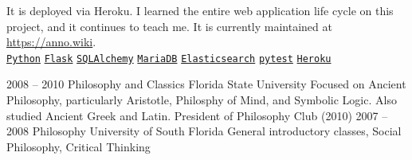 \documentclass[9pt]{developercv} %
\begin{document}
\begin{entrylist}
{            It is deployed via Heroku. I learned the entire web application life
            cycle on this project, and it continues to teach me. It is currently
            maintained at {\href{https://anno.wiki}{https://anno.wiki}}.
        \\
        \texttt{{\href{https://www.python.org/}{Python}}}\slashsep
        \texttt{{\href{https://flask.palletsprojects.com/en/1.1.x/}{Flask}}}\slashsep
        \texttt{{\href{https://www.sqlalchemy.org/}{SQLAlchemy}}}\slashsep
        \texttt{{\href{https://mariadb.org/}{MariaDB}}}\slashsep
        \texttt{{\href{https://www.elastic.co/}{Elasticsearch}}}\slashsep
        \texttt{{\href{https://docs.pytest.org/en/stable/}{pytest}}}\slashsep
        \texttt{{\href{https://www.heroku.com/}{Heroku}}}
        }
\end{entrylist}



\begin{entrylist}
    \entry
    {2008 -- 2010}
    {Philosophy and Classics}
    {Florida State University}
    {Focused on Ancient Philosophy, particularly Aristotle, Philosphy of
        Mind, and Symbolic Logic. Also studied Ancient Greek and Latin.
    President of Philosophy Club (2010)}
    \entry
    {2007 -- 2008}
    {Philosophy}
    {University of South Florida}
    {General introductory classes, Social Philosophy, Critical Thinking}
\end{entrylist}
\end{document}
